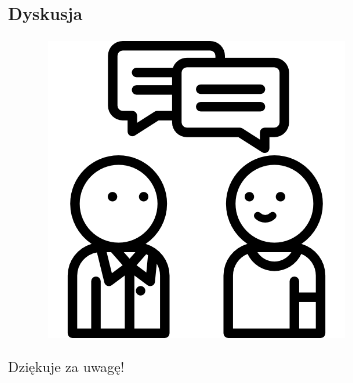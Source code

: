 \documentclass[aspectratio=169]{beamer}
\begin{document}
\begin{frame}
	\frametitle{Dyskusja}
	\begin{figure}
		\centering
		\includegraphics[width=0.7\textwidth]{questions.png}
	\end{figure}
\end{frame}

\begin{frame}
	  \begin{center}
	\Huge Dziękuje za uwagę!
	\end{center}
\end{frame}
\end{document}
